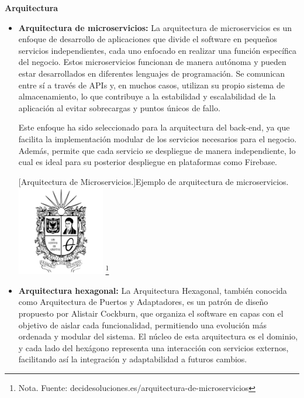 {\begin{itemize}
\end{itemize}
\vspace{5mm}
\textbf{Arquitectura} 
\begin{itemize}
    
    \item \textbf{Arquitectura de microservicios: } La arquitectura de microservicios es un enfoque de desarrollo de aplicaciones que divide el software en pequeños servicios independientes, cada uno enfocado en realizar una función específica del negocio. Estos microservicios funcionan de manera autónoma y pueden estar desarrollados en diferentes lenguajes de programación. Se comunican entre sí a través de APIs y, en muchos casos, utilizan su propio sistema de almacenamiento, lo que contribuye a la estabilidad y escalabilidad de la aplicación al evitar sobrecargas y puntos únicos de fallo.
    
    Este enfoque ha sido seleccionado para la arquitectura del back-end, ya que facilita la implementación modular de los servicios necesarios para el negocio. Además, permite que cada servicio se despliegue de manera independiente, lo cual es ideal para su posterior despliegue en plataformas como Firebase.
    
    \vspace{2mm}
    \begin{minipage}{0.9\textwidth}
        \centering
        [{Arquitectura de Microservicios.}]{Ejemplo de arquitectura de microservicios.}
        \label{microservicios}
        \includegraphics[width=0.3\textwidth]{Content/Images/Escudo_UD.png}
        \footnote{Nota. \textup{Fuente: decidesoluciones.es/arquitectura-de-microservicios}}
    \end{minipage}
    
    \item \textbf{Arquitectura hexagonal: } La Arquitectura Hexagonal, también conocida como Arquitectura de Puertos y Adaptadores, es un patrón de diseño propuesto por Alistair Cockburn, que organiza el software en capas con el objetivo de aislar cada funcionalidad, permitiendo una evolución más ordenada y modular del sistema. El núcleo de esta arquitectura es el dominio, y cada lado del hexágono representa una interacción con servicios externos, facilitando así la integración y adaptabilidad a futuros cambios.
    

\end{itemize}}

